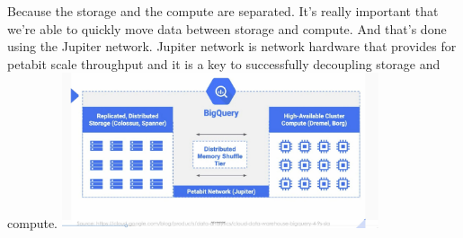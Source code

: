 \documentclass{article}
\begin{document}
\begin{itemize}
\begin{itemize}
	Because the storage and the compute are separated. It's really important that we're able to quickly move data between storage and compute. And that's done using the Jupiter network. Jupiter network is network hardware that provides for petabit scale throughput and it is a key to successfully decoupling storage and compute. 
	\includegraphics[width= 0.7\textwidth]{figure1.jpg}

	
	\end{itemize}
\end{itemize}
\end{document}
